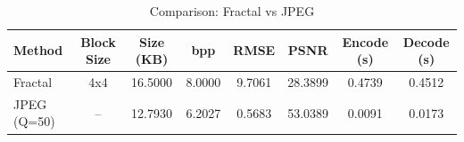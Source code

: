 \begin{table}[h]
\caption{Comparison: Fractal vs JPEG}
\label{tab:compression}
\begin{tabular}{lccccccc}
\toprule
Method & Block Size & Size (KB) & bpp & RMSE & PSNR & Encode (s) & Decode (s) \\
\midrule
Fractal & 4x4 & 16.5000 & 8.0000 & 9.7061 & 28.3899 & 0.4739 & 0.4512 \\
JPEG (Q=50) & -- & 12.7930 & 6.2027 & 0.5683 & 53.0389 & 0.0091 & 0.0173 \\
\bottomrule
\end{tabular}
\end{table}
